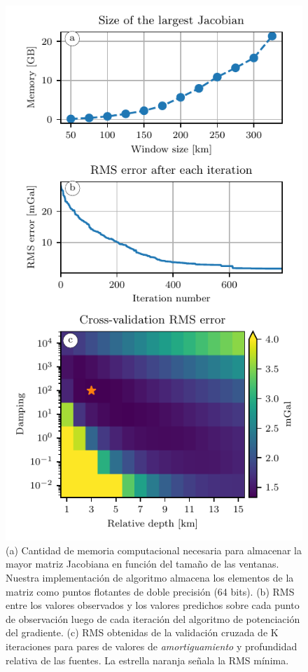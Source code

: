 \begin{figure}
    \centering
    \includegraphics[width=0.6\linewidth]{figs/eql-gradient-boosted/australia-memory-cv-error.pdf}
    \caption{
        (a) Cantidad de memoria computacional necesaria para almacenar la mayor
        matriz Jacobiana en función del tamaño de las ventanas. Nuestra
        implementación de algoritmo almacena los elementos de la matriz como
        puntos flotantes de doble precisión (64 bits).
        (b) \acs{RMS} entre los valores observados y los valores predichos
        sobre cada punto de observación luego de cada iteración del algoritmo
        de potenciación del gradiente.
        (c) \acs{RMS} obtenidas de la validación cruzada de K iteraciones para
        pares de valores de \emph{amortiguamiento} y profundidad relativa de
        las fuentes.
        La estrella naranja señala la \acs{RMS} mínima.
    }
    \label{fig:australia-memory-cv-error}
\end{figure}


